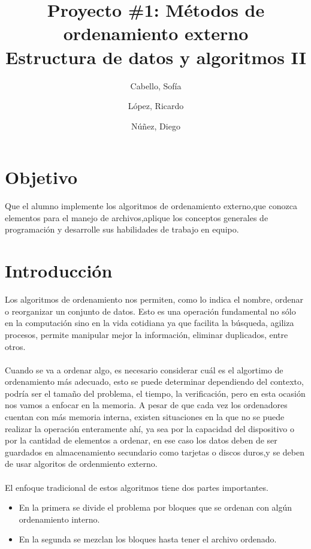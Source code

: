 \documentclass[11pt]{article}
\title{Proyecto \#1: Métodos de ordenamiento externo \\
Estructura de datos y algoritmos II}
\author{Cabello, Sofía
\and López, Ricardo
\and Núñez, Diego}
\begin{document}
\maketitle{}
\section{Objetivo}
Que el alumno implemente los algoritmos de ordenamiento externo,que conozca elementos para el manejo de archivos,aplique los conceptos generales de programación y desarrolle sus habilidades de trabajo en equipo.

\section{Introducción}
Los algoritmos de ordenamiento nos permiten, como lo indica el nombre, ordenar o reorganizar un conjunto de datos. Esto es una operación fundamental no sólo en la computación sino en la vida cotidiana ya que facilita la búsqueda, agiliza procesos, permite manipular mejor la información, eliminar duplicados, entre otros. 

\paragraph{}
Cuando se va a ordenar algo, es necesario considerar cuál es el algortimo de ordenamiento más adecuado, esto se puede determinar dependiendo del contexto, podría ser el tamaño del problema, el tiempo, la verificación, pero en esta ocasión nos vamos a enfocar en la memoria. A pesar de que cada vez los ordenadores cuentan con más memoria interna, existen situaciones en la que no se puede realizar la operación enteramente ahí, ya sea por la capacidad del dispositivo o por la cantidad de elementos a ordenar, en ese caso los datos deben de ser guardados en almacenamiento secundario como tarjetas o discos duros,y se deben de usar algoritos de ordenmiento externo. 


\paragraph{}
El enfoque tradicional de estos algoritmos tiene dos partes importantes. 

\begin{itemize}
\item 
En la primera se divide el problema por bloques que se ordenan con algún ordenamiento interno.
\item
En la segunda se mezclan los bloques hasta tener el archivo ordenado. 
\end{itemize}
\end{document}
